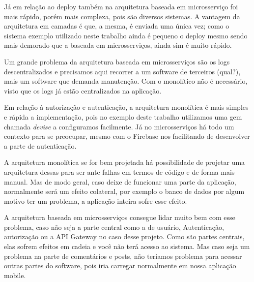 Já em relação ao deploy também na arquitetura baseada em microsserviço foi mais rápido, porém mais complexa, pois são diversos sistemas. A vantagem da arquitetura em camadas é que, a mesma, é enviada uma única vez; como o sistema exemplo utilizado neste trabalho ainda é pequeno o deploy mesmo sendo mais demorado que a baseada em microsserviços, ainda sim é muito rápido.

Um grande problema da arquitetura baseada em microsserviços são os logs descentralizados e precisamos aqui recorrer a um software de terceiros (qual?), mais um software que demanda manutenção. Com o monolítico não é necessário, visto que os logs já estão centralizados na aplicação.

Em relação à autorização e autenticação, a arquitetura monolítica é mais simples e rápida a implementação, pois no exemplo deste trabalho utilizamos uma gem chamada \textit{devise} a configuramos facilmente. Já no microsserviços há todo um contexto para se preocupar, mesmo com o Firebase nos facilitando de desenvolver a parte de autenticação.

A arquitetura monolítica se for bem projetada há possibilidade de projetar uma arquitetura dessas para ser ante falhas em termos de código e de forma mais manual. Mas de modo geral, caso deixe de funcionar uma parte da aplicação, normalmente será um efeito colateral, por exemplo o banco de dados por algum motivo ter um problema, a aplicação inteira sofre esse efeito.

A arquitetura baseada em microsserviços consegue lidar muito bem com esse problema, caso não seja a parte central como a de usuário, Autenticação, autorização ou a API Gateway no caso desse projeto. Como são partes centrais, elas sofrem efeitos em cadeia e você não terá acesso ao sistema. Mas caso seja um problema na parte de comentários e posts, não teríamos problema para acessar outras partes do software, pois iria carregar normalmente em nossa aplicação mobile.


